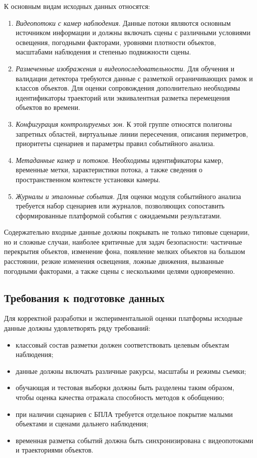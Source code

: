 К основным видам исходных данных относятся:
\begin{enumerate}
    \item \textit{Видеопотоки с камер наблюдения}. Данные потоки являются основным источником информации и должны включать сцены с различными условиями освещения, погодными факторами, уровнями плотности объектов, масштабами наблюдения и степенью подвижности сцены.
    \item \textit{Размеченные изображения и видеопоследовательности}. Для обучения и валидации детектора требуются данные с разметкой ограничивающих рамок и классов объектов. Для оценки сопровождения дополнительно необходимы идентификаторы траекторий или эквивалентная разметка перемещения объектов во времени.
    \item \textit{Конфигурация контролируемых зон}. К этой группе относятся полигоны запретных областей, виртуальные линии пересечения, описания периметров, приоритеты сценариев и параметры правил событийного анализа.
    \item \textit{Метаданные камер и потоков}. Необходимы идентификаторы камер, временные метки, характеристики потока, а также сведения о пространственном контексте установки камеры.
    \item \textit{Журналы и эталонные события}. Для оценки модуля событийного анализа требуется набор сценариев или журналов, позволяющих сопоставить сформированные платформой события с ожидаемыми результатами.
\end{enumerate}

Содержательно входные данные должны покрывать не только типовые сценарии, но и сложные случаи, наиболее критичные для задач безопасности: частичные перекрытия объектов, изменение фона, появление мелких объектов на большом расстоянии, резкие изменения освещения, ложные движения, вызванные погодными факторами, а также сцены с несколькими целями одновременно.

\subsection{Требования к подготовке данных}

Для корректной разработки и экспериментальной оценки платформы исходные данные должны удовлетворять ряду требований:
\begin{itemize}
    \item классовый состав разметки должен соответствовать целевым объектам наблюдения;
    \item данные должны включать различные ракурсы, масштабы и режимы съемки;
    \item обучающая и тестовая выборки должны быть разделены таким образом, чтобы оценка качества отражала способность методов к обобщению;
    \item при наличии сценариев с БПЛА требуется отдельное покрытие малыми объектами и сценами дальнего наблюдения;
    \item временная разметка событий должна быть синхронизирована с видеопотоками и траекториями объектов.
\end{itemize}

